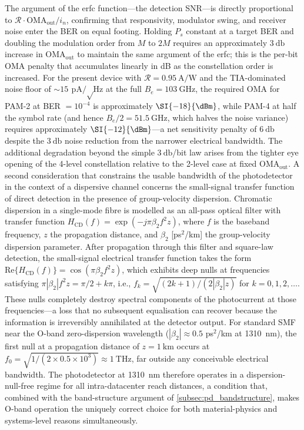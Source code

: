 The argument of the erfc function—the detection SNR—is directly proportional to $\mathcal{R}\cdot\mathrm{OMA}_\mathrm{out}/i_n$, confirming that responsivity, modulator swing, and receiver noise enter the BER on equal footing. Holding $P_s$ constant at a target BER and doubling the modulation order from $M$ to $2M$ requires an approximately $\SI{3}{\decibel}$ increase in $\mathrm{OMA}_\mathrm{out}$ to maintain the same argument of the erfc; this is the per-bit OMA penalty that accumulates linearly in dB as the constellation order is increased. For the present device with $\mathcal{R} = \SI{0.95}{\ampere\per\watt}$ and the TIA-dominated noise floor of $\sim\SI{15}{\pico\ampere\per\sqrt\hertz}$ at the full $B_e = \SI{103}{\giga\hertz}$, the required OMA for PAM-2 at BER $= 10^{-4}$ is approximately $\SI{-18}{\dBm}$, while PAM-4 at half the symbol rate (and hence $B_e/2 = \SI{51.5}{\giga\hertz}$, which halves the noise variance) requires approximately $\SI{-12}{\dBm}$—a net sensitivity penalty of $\SI{6}{\decibel}$ despite the $\SI{3}{\decibel}$ noise reduction from the narrower electrical bandwidth. The additional degradation beyond the simple $\SI{3}{\decibel}$/bit law arises from the tighter eye opening of the 4-level constellation relative to the 2-level case at fixed $\mathrm{OMA}_\mathrm{out}$. A second consideration that constrains the usable bandwidth of the photodetector in the context of a dispersive channel concerns the small-signal transfer function of direct detection in the presence of group-velocity dispersion. Chromatic dispersion in a single-mode fibre is modelled as an all-pass optical filter with transfer function $H_\mathrm{CD}(f) = \exp(-j\pi\beta_2 f^2 z)$, where $f$ is the baseband frequency, $z$ the propagation distance, and $\beta_2$ [ps$^2$/km] the group-velocity dispersion parameter. After propagation through this filter and square-law detection, the small-signal electrical transfer function takes the form $\mathrm{Re}\{H_\mathrm{CD}(f)\} = \cos(\pi\beta_2 f^2 z)$, which exhibits deep nulls at frequencies satisfying $\pi|\beta_2|f^2 z = \pi/2 + k\pi$, i.e., $f_k = \sqrt{(2k+1)/(2|\beta_2|z)}$ for $k = 0, 1, 2, \ldots$. These nulls completely destroy spectral components of the photocurrent at those frequencies—a loss that no subsequent equalisation can recover because the information is irreversibly annihilated at the detector output. For standard SMF near the O-band zero-dispersion wavelength ($|\beta_2| \approx 0.5$ ps$^2$/km at \SI{1310}{\nano\metre}), the first null at a propagation distance of $z = \SI{1}{\kilo\metre}$ occurs at $f_0 = \sqrt{1/(2\times 0.5\times 10^3)} \approx \SI{1}{\tera\hertz}$, far outside any conceivable electrical bandwidth. The photodetector at \SI{1310}{\nano\metre} therefore operates in a dispersion-null-free regime for all intra-datacenter reach distances, a condition that, combined with the band-structure argument of \cref{subsec:pd_bandstructure}, makes O-band operation the uniquely correct choice for both material-physics and systems-level reasons simultaneously.


